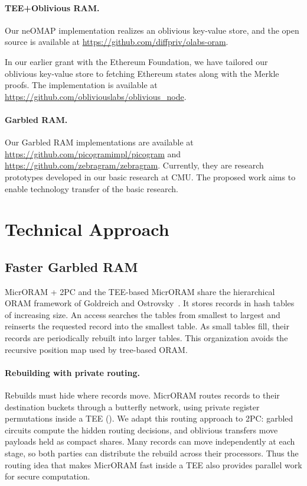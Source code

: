 \paragraph{TEE+Oblivious RAM.}
Our neOMAP implementation realizes an oblivious key-value
store, and the open source is available
at 
\url{https://github.com/diffpriv/olabs-oram}.

In our earlier grant 
with the Ethereum Foundation, we have tailored our oblivious key-value
store to fetching Ethereum states along with the Merkle proofs.
The implementation is available at %
\url{https://github.com/obliviouslabs/oblivious_node}.


\paragraph{Garbled RAM.}
Our Garbled RAM implementations are available at 
\url{https://github.com/picogramimpl/picogram}
and 
\url{https://github.com/zebragram/zebragram}. Currently, 
they are research 
prototypes developed
in our basic research at CMU. 
The proposed work aims to enable
technology transfer of the basic research.  




\section{Technical Approach}


\subsection{Faster Garbled RAM}
\label{sec:gram}

MicrORAM + 2PC and the TEE-based MicrORAM share the hierarchical ORAM
framework of Goldreich and Ostrovsky~\cite{GO96,oram11}. It stores records
in hash tables of increasing size. An access searches the tables from
smallest to largest and reinserts the requested record into the smallest
table. As small tables fill, their records are periodically rebuilt into
larger tables. This organization avoids the recursive position map used
by tree-based ORAM.

\paragraph{Rebuilding with private routing.}
Rebuilds must hide where records move. MicrORAM routes records to their
destination buckets through a butterfly network, using private register
permutations inside a TEE (). We adapt this routing
approach to 2PC: garbled circuits compute the hidden routing decisions,
and oblivious transfers move payloads held as compact shares. Many
records can move independently at each stage, so both parties can
distribute the rebuild across their processors. Thus the routing idea
that makes MicrORAM fast inside a TEE also provides parallel work for
secure computation.

